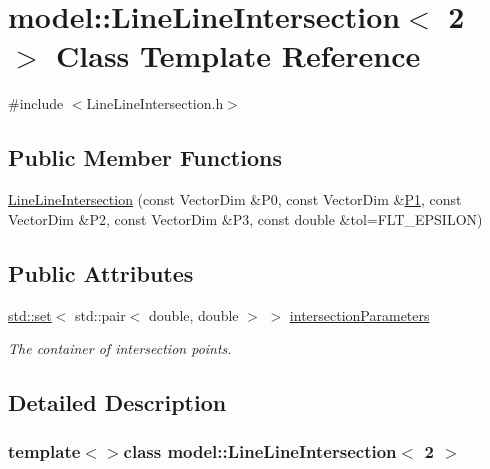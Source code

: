 \hypertarget{classmodel_1_1_line_line_intersection_3_012_01_4}{}\section{model\+:\+:Line\+Line\+Intersection$<$ 2 $>$ Class Template Reference}
\label{classmodel_1_1_line_line_intersection_3_012_01_4}


{\ttfamily \#include $<$Line\+Line\+Intersection.\+h$>$}

\subsection*{Public Member Functions}
\begin{DoxyCompactItemize}
\item 
\hyperlink{classmodel_1_1_line_line_intersection_3_012_01_4_a87a691ed8c555fcea9ffc1d063fe2cb2}{Line\+Line\+Intersection} (const Vector\+Dim \&P0, const Vector\+Dim \&\hyperlink{run_multipole_8m_af93dd7f73e57b8b17d34efa33f0f948e}{P1}, const Vector\+Dim \&P2, const Vector\+Dim \&P3, const double \&tol=F\+L\+T\+\_\+\+E\+P\+S\+I\+L\+O\+N)
\end{DoxyCompactItemize}
\subsection*{Public Attributes}
\begin{DoxyCompactItemize}
\item 
\hyperlink{plot_cells_8m_a03623d69001c34fc77654be29bdc3d8a}{std\+::set}$<$ std\+::pair$<$ double, double $>$ $>$ \hyperlink{classmodel_1_1_line_line_intersection_3_012_01_4_ac9a2f610db897ee536d65b6870e3cdca}{intersection\+Parameters}
\begin{DoxyCompactList}\small\item\em The container of intersection points. \end{DoxyCompactList}\end{DoxyCompactItemize}


\subsection{Detailed Description}
\subsubsection*{template$<$$>$class model\+::\+Line\+Line\+Intersection$<$ 2 $>$}




